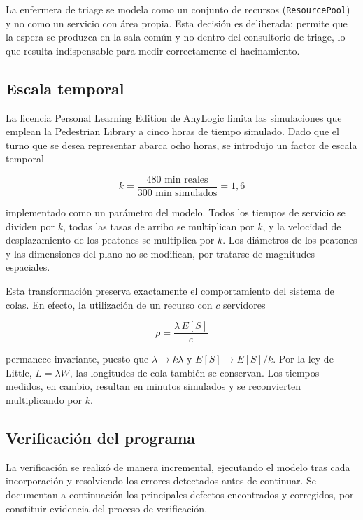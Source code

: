 \documentclass{article}
\begin{document}
La enfermera de triage se modela como un conjunto de recursos
(\texttt{ResourcePool}) y no como un servicio con área propia. Esta decisión
es deliberada: permite que la espera se produzca en la sala común y no dentro
del consultorio de triage, lo que resulta indispensable para medir
correctamente el hacinamiento.

\subsection{Escala temporal}
\label{sec:escala}

La licencia Personal Learning Edition de AnyLogic limita las simulaciones que
emplean la Pedestrian Library a cinco horas de tiempo simulado. Dado que el
turno que se desea representar abarca ocho horas, se introdujo un factor de
escala temporal

\[
k = \frac{480 \text{ min reales}}{300 \text{ min simulados}} = 1{,}6
\]

implementado como un parámetro del modelo. Todos los tiempos de servicio se
dividen por $k$, todas las tasas de arribo se multiplican por $k$, y la
velocidad de desplazamiento de los peatones se multiplica por $k$. Los
diámetros de los peatones y las dimensiones del plano no se modifican, por
tratarse de magnitudes espaciales.

Esta transformación preserva exactamente el comportamiento del sistema de
colas. En efecto, la utilización de un recurso con $c$ servidores

\[
\rho = \frac{\lambda\, E[S]}{c}
\]

permanece invariante, puesto que $\lambda \to k\lambda$ y
$E[S] \to E[S]/k$. Por la ley de Little, $L = \lambda W$, las longitudes de
cola también se conservan. Los tiempos medidos, en cambio, resultan en
minutos simulados y se reconvierten multiplicando por $k$.

\subsection{Verificación del programa}

La verificación se realizó de manera incremental, ejecutando el modelo tras
cada incorporación y resolviendo los errores detectados antes de continuar.
Se documentan a continuación los principales defectos encontrados y
corregidos, por constituir evidencia del proceso de verificación.
\end{document}
